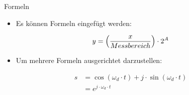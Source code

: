 \documentclass[aspectratio=169]{beamer}
\begin{document}
\begin{frame}{Formeln}
    \begin{itemize}
        \item Es können Formeln eingefügt werden:
    \end{itemize}

    \begin{equation*}
        \begin{split}
            y = \parenth*{\frac{x}{Messbereich}} \cdot 2^A \\
        \end{split}
    \end{equation*}

    {
        \begin{itemize}
            \item Um mehrere Formeln ausgerichtet darzustellen:
        \end{itemize}

        \begin{equation*}
            \begin{split}
                s & = \cos(\omega_d \cdot t) + j \cdot \sin(\omega_d \cdot t) \\
                & = e^{j \cdot \omega_d \cdot t}
            \end{split}
        \end{equation*}
    }
\end{frame}


\miniframesoff

\questions{}


\end{document}
